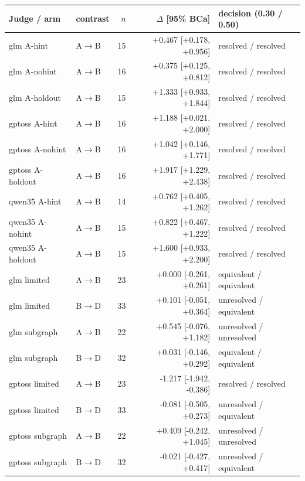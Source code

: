\begin{tabular}{@{}llrrl@{}}
\toprule
Judge / arm & contrast & $n$ & $\Delta$ [95\% BCa] & decision (0.30 / 0.50) \\
\midrule
glm A-hint & A$\to$B & 15 & +0.467 [+0.178, +0.956] & resolved / resolved \\
glm A-nohint & A$\to$B & 16 & +0.375 [+0.125, +0.812] & resolved / resolved \\
glm A-holdout & A$\to$B & 15 & +1.333 [+0.933, +1.844] & resolved / resolved \\
gptoss A-hint & A$\to$B & 16 & +1.188 [+0.021, +2.000] & resolved / resolved \\
gptoss A-nohint & A$\to$B & 16 & +1.042 [+0.146, +1.771] & resolved / resolved \\
gptoss A-holdout & A$\to$B & 16 & +1.917 [+1.229, +2.438] & resolved / resolved \\
qwen35 A-hint & A$\to$B & 14 & +0.762 [+0.405, +1.262] & resolved / resolved \\
qwen35 A-nohint & A$\to$B & 15 & +0.822 [+0.467, +1.222] & resolved / resolved \\
qwen35 A-holdout & A$\to$B & 15 & +1.600 [+0.933, +2.200] & resolved / resolved \\
\midrule
glm limited & A$\to$B & 23 & +0.000 [-0.261, +0.261] & equivalent / equivalent \\
glm limited & B$\to$D & 33 & +0.101 [-0.051, +0.364] & unresolved / equivalent \\
glm subgraph & A$\to$B & 22 & +0.545 [-0.076, +1.182] & unresolved / unresolved \\
glm subgraph & B$\to$D & 32 & +0.031 [-0.146, +0.292] & equivalent / equivalent \\
gptoss limited & A$\to$B & 23 & -1.217 [-1.942, -0.386] & resolved / resolved \\
gptoss limited & B$\to$D & 33 & -0.081 [-0.505, +0.273] & unresolved / equivalent \\
gptoss subgraph & A$\to$B & 22 & +0.409 [-0.242, +1.045] & unresolved / unresolved \\
gptoss subgraph & B$\to$D & 32 & -0.021 [-0.427, +0.417] & unresolved / equivalent \\
\bottomrule
\end{tabular}
